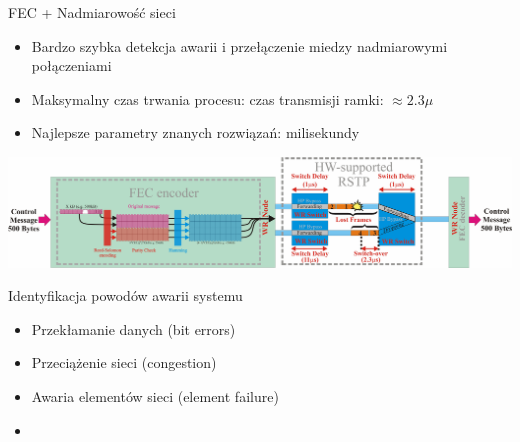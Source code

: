 \documentclass[compress,red]{beamer}
\begin{document}
\begin{frame}{FEC + Nadmiarowość sieci}

  \begin{itemize}
    \item Bardzo szybka detekcja awarii i przełączenie miedzy nadmiarowymi połączeniami
    \item Maksymalny czas trwania procesu: czas transmisji ramki: $\approx 2.3 \mu$
    \item Najlepsze parametry znanych rozwiązań: milisekundy
  \end{itemize}

      \begin{center}
      \includegraphics[width=1.0\textwidth]{robustness/FECandRSTP.pdf}
      \end{center}


\end{frame}
\begin{frame}{Identyfikacja powodów awarii systemu}


  \begin{itemize}
    \item Przekłamanie danych (bit errors)
    \item Przeciążenie sieci (congestion)
    \item Awaria elementów sieci (element failure)
    \item {}
  \end{itemize}

\end{frame}
\end{document}
